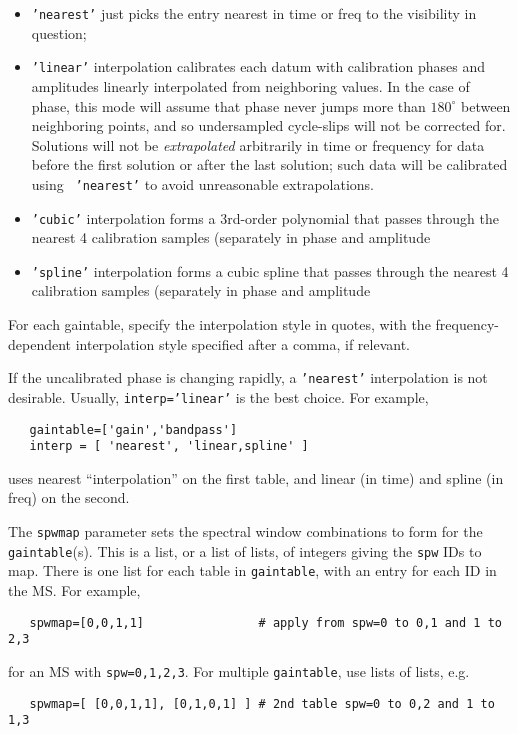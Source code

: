 \begin{itemize}
\item {\tt 'nearest'} just picks the entry nearest in time or freq to the
   visibility in question;

\item {\tt 'linear'} interpolation calibrates each datum with
   calibration phases and amplitudes linearly 
   interpolated from neighboring values. In the case of phase,
   this mode will assume that phase never jumps more than $180^\circ$
   between neighboring points, and so undersampled cycle-slips will
   not be corrected for.  Solutions will not be {\em extrapolated}
   arbitrarily in time or frequency for data before the first solution or after
   the last solution; such data will be calibrated using {\tt
   'nearest'} to avoid unreasonable extrapolations.

\item {\tt 'cubic'} interpolation forms a 3rd-order polynomial that
   passes through the nearest 4 calibration samples (separately in
   phase and amplitude

\item {\tt 'spline'} interpolation forms a cubic spline that
   passes through the nearest 4 calibration samples (separately in
   phase and amplitude

\end{itemize}

For each gaintable, specify the interpolation style in quotes, with
the frequency-dependent interpolation style specified after a comma,
if relevant.

If the uncalibrated phase is changing rapidly, a {\tt 'nearest'}
interpolation is not desirable. Usually, {\tt interp='linear'} is the
best choice. For example,
\small
\begin{verbatim}
   gaintable=['gain','bandpass']
   interp = [ 'nearest', 'linear,spline' ]
\end{verbatim}
\normalsize
uses nearest ``interpolation'' on the first table, and linear (in
time) and spline (in freq) on the second.

The {\tt spwmap} parameter sets the spectral window combinations to
form for the {\tt gaintable}(s).  This is a list, or a list of lists,
of integers giving the {\tt spw} IDs to map.  There is one list for
each table in {\tt gaintable}, with an entry for each ID in the MS.
For example,
\small
\begin{verbatim}
   spwmap=[0,0,1,1]                # apply from spw=0 to 0,1 and 1 to 2,3
\end{verbatim}
\normalsize
for an MS with {\tt spw=0,1,2,3}.  For multiple {\tt gaintable}, use
lists of lists, e.g.
\small
\begin{verbatim}
   spwmap=[ [0,0,1,1], [0,1,0,1] ] # 2nd table spw=0 to 0,2 and 1 to 1,3
\end{verbatim} 
\normalsize

